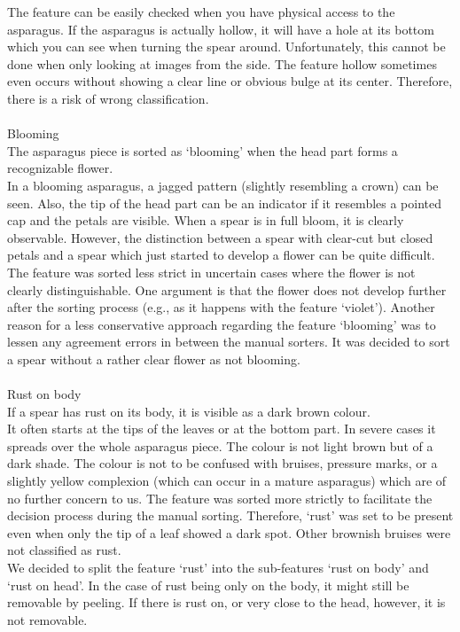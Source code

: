 The feature can be easily checked when you have physical access to the asparagus. If the asparagus is actually hollow, it will have a hole at its bottom which you can see when turning the spear around. Unfortunately, this cannot be done when only looking at images from the side. The feature hollow sometimes even occurs without showing a clear line or obvious bulge at its center. Therefore, there is a risk of wrong classification. \\
 \\
Blooming \\
The asparagus piece is sorted as ‘blooming’ when the head part forms a recognizable flower. \\
In a blooming asparagus, a jagged pattern (slightly resembling a crown) can be seen. Also, the tip of the head part can be an indicator if it resembles a pointed cap and the petals are visible. When a spear is in full bloom, it is clearly observable. However, the distinction between a spear with clear-cut but closed petals and a spear which just started to develop a flower can be quite difficult. \\
The feature was sorted less strict in uncertain cases where the flower is not clearly distinguishable. One argument is that the flower does not develop further after the sorting process (e.g., as it happens with the feature ‘violet’). Another reason for a less conservative approach regarding the feature ‘blooming’ was to lessen any agreement errors in between the manual sorters. It was decided to sort a spear without a rather clear flower as not blooming. \\
 \\
Rust on body \\
If a spear has rust on its body, it is visible as a dark brown colour. \\
It often starts at the tips of the leaves or at the bottom part. In severe cases it spreads over the whole asparagus piece. The colour is not light brown but of a dark shade. The colour is not to be confused with bruises, pressure marks, or a slightly yellow complexion (which can occur in a mature asparagus) which are of no further concern to us.
The feature was sorted more strictly to facilitate the decision process during the manual sorting. Therefore, ‘rust’ was set to be present even when only the tip of a leaf showed a dark spot. Other brownish bruises were not classified as rust. \\
We decided to split the feature ‘rust’ into the sub-features ‘rust on body’ and ‘rust on head’. In the case of rust being only on the body, it might still be removable by peeling. If there is rust on, or very close to the head, however, it is not removable. \\
